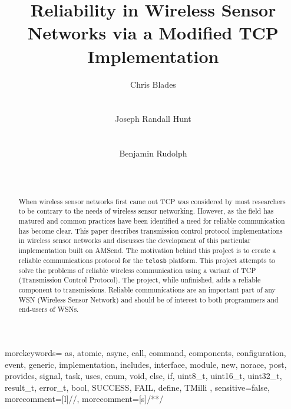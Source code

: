\documentclass{sig-alternate}
\begin{document}
%
\crdata{\empty}
\title{Reliability in Wireless Sensor Networks via a Modified TCP Implementation}
\renewcommand{\ttdefault}{par}
{
    morekeywords=
    {
        as, atomic, async, call,
        command, components, configuration, event, generic,
        implementation, includes, interface, module, new, norace, post,
        provides, signal, task, uses, enum, void, else, if, uint8_t,
        uint16_t, uint32_t, result_t, error_t, bool, SUCCESS, FAIL,
        define, TMilli
    },
    sensitive=false,
    morecomment=[l]{//},
    morecomment=[s]{/*}{*/}
}
\author{
\alignauthor Chris Blades\\
       \\
       \\
\alignauthor Joseph Randall Hunt\\
      \\
      \\
\alignauthor Benjamin Rudolph\\
         \\
         \\
}
\maketitle
\begin{abstract}
  When wireless sensor networks first came out TCP was considered by most researchers to be contrary to the needs of wireless sensor networking. However, as the field has matured and common practices have been identified a need for reliable communication has become clear. This paper describes transmission control protocol implementations in wireless sensor networks and discusses the development of this particular implementation built on AMSend. The motivation behind this project is to create a reliable communications protocol for the \texttt{telosb} platform. This project attempts to solve the problems of reliable wireless communication using a variant of TCP (Transmission Control Protocol). The project, while unfinished, adds a reliable component to transmissions. Reliable communications are an important part of any WSN (Wireless Sensor Network) and should be of interest to both programmers and end-users of WSNs.
\end{abstract}
\end{document}
